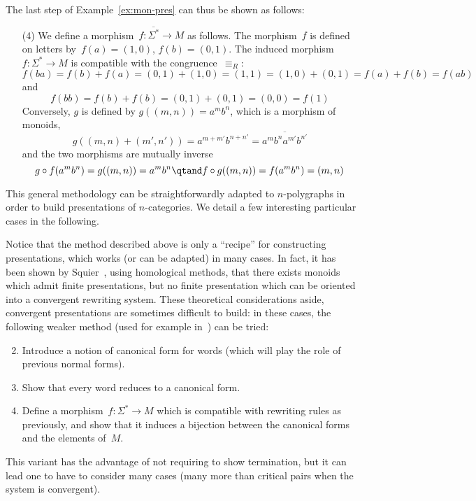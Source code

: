 \documentclass{LMCS}
\begin{document}
\begin{exa}
  The last step of Example~\ref{ex:mon-pres} can thus be shown as follows:
  \begin{itemize}
  \item[(4)] We define a morphism~$f:\overline{\Sigma^*}\to M$ as follows. The
    morphism~$f$ is defined on letters by~$f(a)=(1,0)$, $f(b)=(0,1)$. The
    induced morphism~$f:\Sigma^*\to M$ is compatible with the
    congruence~$\equiv_R$:
    \[
    f(ba)=f(b)+f(a)=(0,1)+(1,0)=(1,1)=(1,0)+(0,1)=f(a)+f(b)=f(ab)
    \]
    and
    \[
    f(bb)=f(b)+f(b)=(0,1)+(0,1)=(0,0)=f(1)
    \]
    Conversely, $g$ is defined by $g((m,n))=a^mb^n$, which is a morphism of monoids,
    \ie
    \[
    g((m,n)+(m',n'))=a^{m+m'}b^{n+n'}=\overline{a^mb^na^{m'}b^{n'}}
    \]
    and the two morphisms are mutually inverse
    \[
    g\circ f(a^mb^n)=g((m,n))=a^mb^n
    \qtand
    f\circ g((m,n))=f(a^mb^n)=(m,n)
    \]
  \end{itemize}
\end{exa}

This general methodology can be straightforwardly adapted to $n$-polygraphs in
order to build presentations of $n$-categories. We detail a few interesting
particular cases in the following.

\begin{rem}
  Notice that the method described above is only a ``recipe'' for constructing
  presentations, which works (or can be adapted) in many cases. In fact, it has
  been shown by Squier~\cite{squier:word-problems,
    lafont-proute:homology-monoids}, using homological methods, that there
  exists monoids which admit finite presentations, but no finite presentation
  which can be oriented into a convergent rewriting system. These theoretical
  considerations aside, convergent presentations are sometimes difficult to
  build: in these cases, the following weaker method (used for example
  in~\cite{lafont:boolean-circuits}) can be tried:
  \begin{enumerate}
    \setcounter{enumi}{1}
  \item Introduce a notion of canonical form for words (which will play the role
    of previous normal forms).
  \item Show that every word reduces to a canonical form.
  \item Define a morphism~$f:\Sigma^*\to M$ which is compatible with rewriting
    rules as previously, and show that it induces a bijection between the
    canonical forms and the elements of~$M$.
  \end{enumerate}
  This variant has the advantage of not requiring to show termination, but it
  can lead one to have to consider many cases (many more than critical pairs when
  the system is convergent).
\end{rem}
\end{document}

